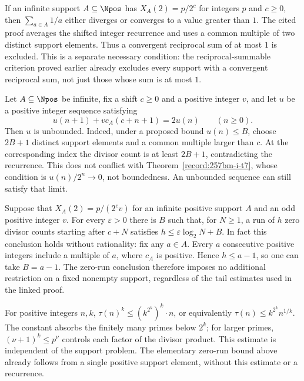 \begin{thm}\label{record:257rig-i2}
If an infinite support $A\subseteq\Npos$ has $X_A(2)=p/2^c$ for
integers $p$ and $c\ge0$, then $\sum_{a\in A}1/a$ either diverges or
converges to a value greater than $1$. The cited proof averages the
shifted integer recurrence and uses a common multiple of two distinct
support elements. Thus a convergent reciprocal sum of at most $1$ is
excluded. This is a separate necessary condition: the reciprocal-summable
criterion proved earlier already excludes every support with a convergent
reciprocal sum, not just those whose sum is at most $1$.
\end{thm}

\begin{thm}\label{record:257rig-i3}
Let $A\subseteq\Npos$ be infinite, fix a shift $c\ge0$ and a positive
integer $v$, and let $u$ be a positive integer sequence satisfying
\[
 u(n+1)+v c_A(c+n+1)=2u(n)\qquad(n\ge0).
\]
Then $u$ is unbounded. Indeed, under a proposed bound $u(n)\le B$,
choose $2B+1$ distinct support elements and a common multiple larger
than $c$. At the corresponding index the divisor count is at least
$2B+1$, contradicting the recurrence. This does not conflict with
Theorem~\ref{record:257bm-i-t7}, whose condition is $u(n)/2^n\to0$,
not boundedness. An unbounded sequence can still satisfy that limit.
\end{thm}

\begin{thm}\label{record:257rig-i4a}
Suppose that $X_A(2)=p/(2^cv)$ for an infinite positive support $A$
and an odd positive integer $v$. For every $\varepsilon>0$ there is
$B$ such that, for $N\ge1$, a run of $h$ zero divisor counts starting
after $c+N$ satisfies $h\le\varepsilon\log_2N+B$.
In fact this conclusion holds without rationality: fix any $a\in A$.
Every $a$ consecutive positive integers include a multiple of $a$, where
$c_A$ is positive. Hence $h\le a-1$, so one can take $B=a-1$.
The zero-run conclusion therefore imposes no additional restriction on
a fixed nonempty support, regardless of the tail estimates used in the
linked proof.
\end{thm}

\begin{prop}\label{record:257rig-i4b}
For positive integers $n,k$,
$\tau(n)^k \le (k^{2^k})^k\cdot n$, or equivalently
$\tau(n)\le k^{2^k}n^{1/k}$. The constant absorbs the finitely many primes
below $2^k$; for larger primes, $(\nu+1)^k\le p^\nu$ controls each factor
of the divisor product. This estimate is independent of the support
problem. The elementary zero-run bound above already follows from a
single positive support element, without this estimate or a recurrence.
\end{prop}

